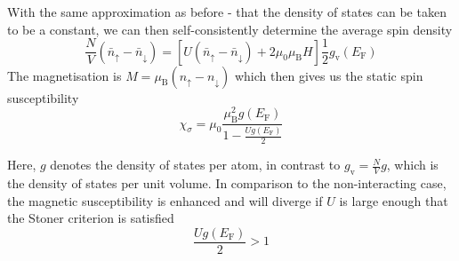 \documentclass[12pt,a4paper]{article}
\begin{document}
With the same approximation as before - that the density of states can be taken to be a constant, we can then self-consistently determine the average spin density
$$
\frac{N}{V}\left(\bar{n}_{\uparrow}-\bar{n}_{\downarrow}\right)=\left[U\left(\bar{n}_{\uparrow}-\bar{n}_{\downarrow}\right)+2 \mu_0 \mu_{\mathrm{B}} H\right] \frac{1}{2} g_{\mathrm{v}}\left(E_{\mathrm{F}}\right)
$$
The magnetisation is $M=\mu_{\mathrm{B}}\left(n_{\uparrow}-n_{\downarrow}\right)$ which then gives us the static spin susceptibility
$$
\chi_\sigma=\mu_0 \frac{\mu_{\mathrm{B}}^2 g\left(E_{\mathrm{F}}\right)}{1-\frac{U g\left(E_{\mathrm{F}}\right)}{2}}
$$

Here, $g$ denotes the density of states per atom, in contrast to $g_{\mathrm{v}}=\frac{N}{V} g$, which is the density of states per unit volume. In comparison to the non-interacting case, the magnetic susceptibility is enhanced and will diverge if $U$ is large enough that the Stoner criterion is satisfied
$$
\frac{U g\left(E_{\mathrm{F}}\right)}{2}>1
$$
\end{document}
